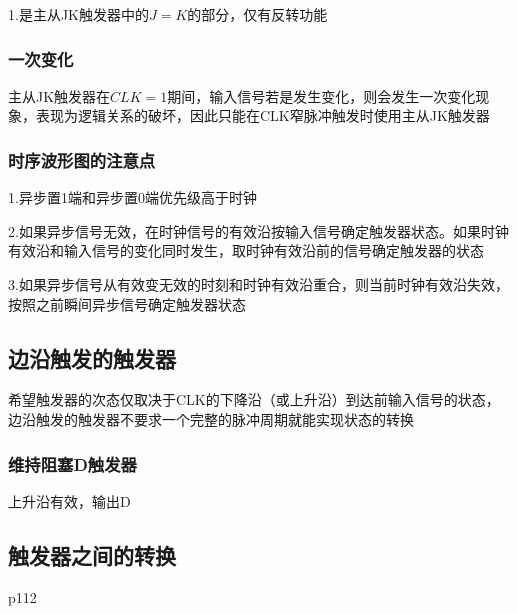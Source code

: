 \documentclass[11pt,twoside,a4paper]{ctexart}
\begin{document}
    1.是主从JK触发器中的$J = K$的部分，仅有反转功能

    \subsubsection{一次变化}

    主从JK触发器在$CLK = 1$期间，输入信号若是发生变化，则会发生一次变化现象，表现为逻辑关系的破坏，因此只能在CLK窄脉冲触发时使用主从JK触发器

    \subsubsection{时序波形图的注意点}

    1.异步置1端和异步置0端优先级高于时钟

    2.如果异步信号无效，在时钟信号的有效沿按输入信号确定触发器状态。如果时钟有效沿和输入信号的变化同时发生，取时钟有效沿前的信号确定触发器的状态

    3.如果异步信号从有效变无效的时刻和时钟有效沿重合，则当前时钟有效沿失效，按照之前瞬间异步信号确定触发器状态

    \subsection{边沿触发的触发器}

    希望触发器的次态仅取决于CLK的下降沿（或上升沿）到达前输入信号的状态，边沿触发的触发器不要求一个完整的脉冲周期就能实现状态的转换

    \subsubsection{维持阻塞D触发器}

    上升沿有效，输出D

    \subsection{触发器之间的转换}
    p112
\end{document}
